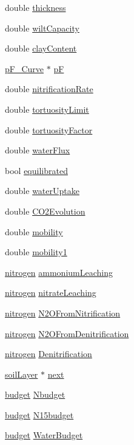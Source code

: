 \begin{DoxyCompactItemize}
\item 
double \hyperlink{classsoil_layer_adaeedd67db3ed2312056db1469945ffa}{thickness}
\item 
double \hyperlink{classsoil_layer_ae98e1db7a6e369ad8c15667150daaaf0}{wiltCapacity}
\item 
double \hyperlink{classsoil_layer_aaf3922a3efbd185e030373650622b630}{clayContent}
\item 
\hyperlink{classp_f___curve}{pF\_\-Curve} $\ast$ \hyperlink{classsoil_layer_ac97a45048a4d857718e2ab7bbe581619}{pF}
\item 
double \hyperlink{classsoil_layer_a50746e4427b349f891f3be4eb3bd6878}{nitrificationRate}
\item 
double \hyperlink{classsoil_layer_abe6002dd278efb361b9adc4cfb299d92}{tortuosityLimit}
\item 
double \hyperlink{classsoil_layer_a66083592805c4855ebadd04056505349}{tortuosityFactor}
\item 
double \hyperlink{classsoil_layer_a7c798f757104d72b66f54e76e284097f}{waterFlux}
\item 
bool \hyperlink{classsoil_layer_a5dcc4d96a38106a631098dd65f4a7e6d}{equilibrated}
\item 
double \hyperlink{classsoil_layer_aea0648625d45f262740d107bbdfa4d55}{waterUptake}
\item 
double \hyperlink{classsoil_layer_a99d47de1a6d78f922c9d988b691422fd}{CO2Evolution}
\item 
double \hyperlink{classsoil_layer_abc49478bbf466b7211f02fcd32a84e9f}{mobility}
\item 
double \hyperlink{classsoil_layer_a529a180a696b6f94ae72126ae7ee42b8}{mobility1}
\item 
\hyperlink{classnitrogen}{nitrogen} \hyperlink{classsoil_layer_a5dd2dd5bfbdfc6d2e79a50136185da04}{ammoniumLeaching}
\item 
\hyperlink{classnitrogen}{nitrogen} \hyperlink{classsoil_layer_a4082fb4d9c9c2a1decbe1dc735a1c3f7}{nitrateLeaching}
\item 
\hyperlink{classnitrogen}{nitrogen} \hyperlink{classsoil_layer_ac067c039016361465b827a712fc4ee46}{N2OFromNitrification}
\item 
\hyperlink{classnitrogen}{nitrogen} \hyperlink{classsoil_layer_a4ba9ff292a84bae74b17671f46c2d32d}{N2OFromDenitrification}
\item 
\hyperlink{classnitrogen}{nitrogen} \hyperlink{classsoil_layer_adad888a2d01d277a32514646edb71c9e}{Denitrification}
\item 
\hyperlink{classsoil_layer}{soilLayer} $\ast$ \hyperlink{classsoil_layer_af34f26ea69c673eaa8db70f6c0572373}{next}
\item 
\hyperlink{classbudget}{budget} \hyperlink{classsoil_layer_a2fb9c4c31dd844007f1bf229e69fd1fa}{Nbudget}
\item 
\hyperlink{classbudget}{budget} \hyperlink{classsoil_layer_a50898c77bd337a9cd05b278876634b84}{N15budget}
\item 
\hyperlink{classbudget}{budget} \hyperlink{classsoil_layer_aa005dc5bb5f38857b311ba363a57de9f}{WaterBudget}
\end{DoxyCompactItemize}


